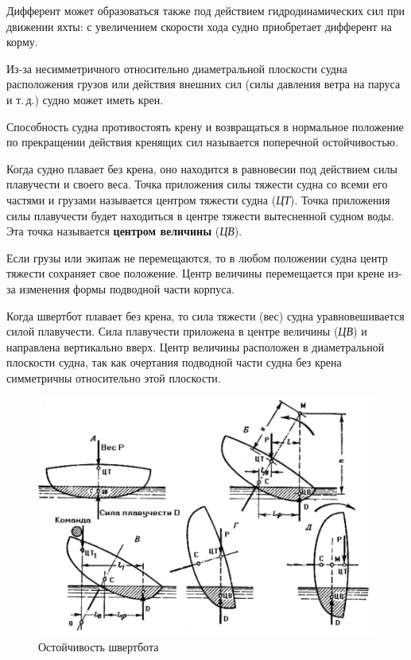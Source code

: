 \documentclass[a4paper, 12pt, twoside, final]{scrbook}
\begin{document}
Дифферент может образоваться также под действием гидродинамических сил при движении яхты: с увеличением скорости хода судно приобретает дифферент на корму.

Из-за несимметричного относительно диаметральной плоскости судна расположения грузов или действия внешних сил (силы давления ветра на паруса и т.\,д.) судно может иметь крен.

Способность судна противостоять крену и возвращаться в нормальное положение по прекращении действия кренящих сил называется поперечной остойчивостью.

Когда судно плавает без крена, оно находится в равновесии под действием силы плавучести и своего веса. Точка приложения силы тяжести судна со всеми его частями и грузами называется центром тяжести судна (\textit{ЦТ}). Точка приложения силы плавучести будет находиться в центре тяжести вытесненной судном воды. Эта точка называется \textbf{центром величины} (\textit{ЦВ}).

Если грузы или экипаж не перемещаются, то в любом положении судна центр тяжести сохраняет свое положение. Центр величины перемещается при крене из-за изменения формы подводной части корпуса.

Когда швертбот плавает без крена, то сила тяжести (вес) судна уравновешивается силой плавучести. Сила плавучести приложена в центре величины (\textit{ЦВ}) и направлена вертикально вверх. Центр величины расположен в диаметральной плоскости судна, так как очертания подводной части судна без крена симметричны относительно этой плоскости.

\begin{figure}[htbp]
   \centering
   \includegraphics{78_Ostojchivost_shvertbota} %
   \caption{Остойчивость швертбота}
   \label{fig:78}
\end{figure}
\end{document}
